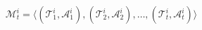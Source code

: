 \documentclass[preview]{standalone}
\begin{document}
\begin{align*}
\mathcal{M}_t^i = \langle (\mathcal{T}_1^i, \mathcal{A}_1^i), (\mathcal{T}_2^i, \mathcal{A}_2^i), \dots, (\mathcal{T}_t^i, \mathcal{A}_t^i)\rangle
\end{align*}
\end{document}
